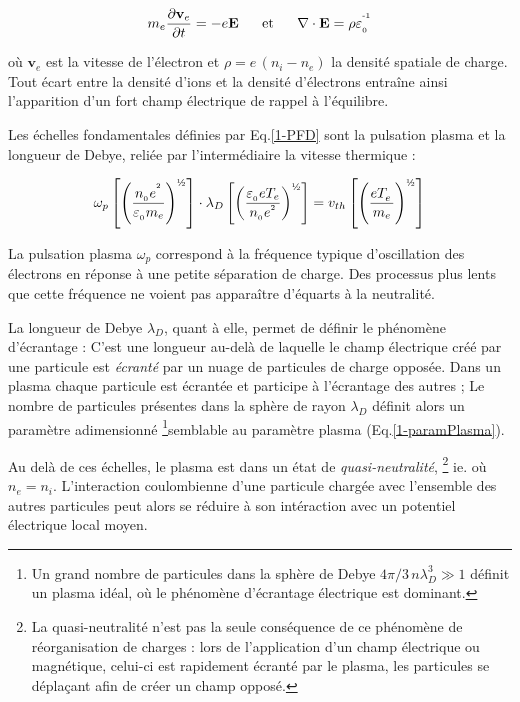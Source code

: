 \begin{align}
\label{1-PFD}
m_e\frac{\partial \mathbf{v}_e}{\partial t}=-e\mathbf E
\;\;\;\;\;\;\text{et}\;\;\;\;\;\;
\nabla\cdot\mathbf{E}=\rho\varepsilon_{_0}^{\operatorname{^{-1}}}
\end{align}

où $\mathbf{v}_e$ est la vitesse de l'électron et $\rho=e\,(n_i-n_e)$ 
la densité spatiale de charge.
Tout écart entre la densité d'ions et la densité d'électrons
entraîne ainsi l'apparition d'un fort champ électrique de rappel à l'équilibre.

Les échelles fondamentales définies par Eq.\ref{1-PFD} sont la pulsation
plasma et la longueur de Debye, reliée par l'intermédiaire la vitesse thermique :

\begin{equation}
\omega_p\left[\left(\frac{n_{_0}e^{^2}}{\varepsilon_{_0}
m_e}\right)^\text{\textonehalf}
\right]\cdot\lambda_D\left[\left(\frac{\varepsilon_{_0}
eT_e}{n_{_0}e^{^2}}\right)^\text{\textonehalf}\right]
=v_{th}\left[\left(\frac{eT_e^{^{\phantom{1}}}}{m_e}\right)^\text{\textonehalf}\right]
\end{equation}

La pulsation plasma $\omega_p$ correspond à la fréquence typique d'oscillation des électrons en réponse 
à une petite séparation de charge. Des processus plus lents que cette fréquence ne voient
pas apparaître d'équarts à la neutralité. 

La longueur de Debye $\lambda_D$, quant à elle, permet de définir le phénomène d'écrantage :
C'est une longueur au-delà de laquelle le champ électrique créé par une particule est \emph{écranté} par 
un nuage de particules de charge opposée. Dans un plasma chaque particule est écrantée et participe
à l'écrantage des autres ; Le nombre de particules présentes
dans la sphère de rayon $\lambda_D$ définit alors un paramètre adimensionné
\footnote{Un
grand nombre de particules dans la sphère de Debye $4\pi/3\,n\lambda_D^3\gg1$
définit un plasma idéal, où le phénomène d'écrantage électrique est
dominant.}semblable au paramètre plasma (Eq.\ref{1-paramPlasma}).

Au delà de ces échelles, le plasma est dans un état de \emph{quasi-neutralité},
\footnote{La quasi-neutralité n'est pas la seule conséquence de ce phénomène de réorganisation
de charges : lors de l'application d'un champ électrique ou magnétique, celui-ci est rapidement
écranté par le plasma, les particules se
déplaçant afin de créer un champ opposé.} 
ie. où $n_e=n_i$.
L'interaction coulombienne d'une particule chargée avec l'ensemble des autres particules peut alors
se réduire à son intéraction avec un potentiel électrique local moyen.

